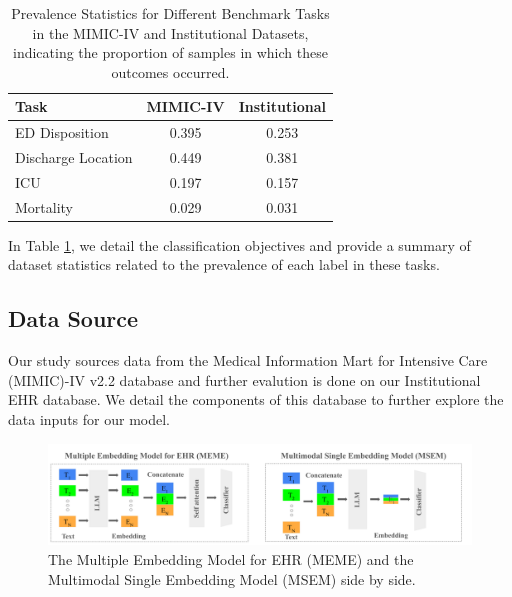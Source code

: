 \documentclass{article}
\theoremstyle{plain}
\theoremstyle{definition}
\theoremstyle{remark}
\begin{document}
\begin{table}[h!]
\caption{Prevalence Statistics for Different Benchmark Tasks in the MIMIC-IV and Institutional Datasets, indicating the proportion of samples in which these outcomes occurred.}
\label{prevalence-table}
\begin{center}
\begin{small}
\begin{sc}
\begin{tabular}{lcc}
\toprule
Task & MIMIC-IV & Institutional \\
\midrule
ED Disposition & 0.395 & 0.253 \\
\bottomrule
Discharge Location & 0.449 & 0.381 \\
ICU & 0.197 & 0.157 \\
Mortality & 0.029 & 0.031 \\
\bottomrule
\end{tabular}
\end{sc}
\end{small}
\end{center}
\end{table}

 In Table \ref{prevalence-table}, we detail the classification objectives and provide a summary of dataset statistics related to the prevalence of each label in these tasks.

\subsection{Data Source}

Our study sources data from the Medical Information Mart for Intensive Care (MIMIC)-IV v2.2 database \citep{johnson_mimic-iv_nodate} 
and further evalution is done on our Institutional EHR database. 
We detail the components of this database to further explore the data inputs for our model. 


\begin{figure}[t]
   \centering 
   \includegraphics[width=6in]{plots/arc.png} 
   \caption{The Multiple Embedding Model for EHR (MEME) and the Multimodal Single Embedding Model (MSEM) side by side.}
   \label{arc} 

 \end{figure} 
\end{document}
